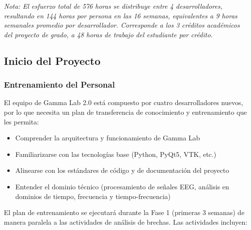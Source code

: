 \documentclass{article}
\begin{document}
\textit{Nota: El esfuerzo total de 576 horas se distribuye entre 4 desarrolladores, resultando en 144 horas por persona en las 16 semanas, equivalentes a 9 horas semanales promedio por desarrollador. Corresponde a los 3 créditos académicos del proyecto de grado, a 48 horas de trabajo del estudiante por crédito.}

\subsection{Inicio del Proyecto}

\subsubsection{Entrenamiento del Personal}

El equipo de Gamma Lab 2.0 está compuesto por cuatro desarrolladores nuevos, por lo que necesita un plan de transferencia de conocimiento y entrenamiento que les permita:

\begin{itemize}
    \item Comprender la arquitectura y funcionamiento de Gamma Lab
    \item Familiarizarse con las tecnologías base (Python, PyQt5, VTK, etc.)
    \item Alinearse con los estándares de código y de documentación del proyecto
    \item Entender el dominio técnico (procesamiento de señales EEG, análisis en dominios de tiempo, frecuencia y tiempo-frecuencia)
\end{itemize}

El plan de entrenamiento se ejecutará durante la Fase 1 (primeras 3 semanas) de manera paralela a las actividades de análisis de brechas. Las actividades incluyen:
\end{document}
